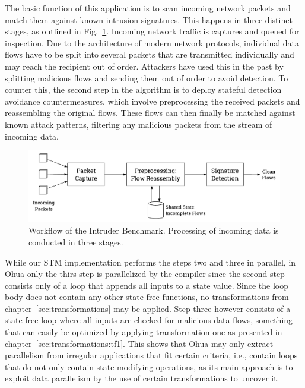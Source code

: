 The basic function of this application is to scan incoming network packets and match them against known intrusion signatures.
This happens in three distinct stages, as outlined in Fig.~\ref{fig:experiments:intruder:workflow}.
Incoming network traffic is captures and queued for inspection.
Due to the architecture of modern network protocols, individual data flows have to be split into several packets that are transmitted individually and may reach the recipient out of order.
Attackers have used this in the past by splitting malicious flows and sending them out of order to avoid detection.
To counter this, the second step in the algorithm is to deploy stateful detection avoidance countermeasures, which involve preprocessing the received packets and reassembling the original flows.
These flows can then finally be matched against known attack patterns, filtering any malicious packets from the stream of incoming data.

\begin{figure}
    \includegraphics[width=\textwidth,keepaspectratio]{gfx/experiments-intruder}
    \caption{Workflow of the Intruder Benchmark. Processing of incoming data is conducted in three stages.}%
    \label{fig:experiments:intruder:workflow}
\end{figure}

While our STM implementation performs the steps two and three in parallel, in Ohua only the thirs step is parallelized by the compiler since the second step consists only of a loop that appends all inputs to a state value.
Since the loop body does not contain any other state-free functions, no transformations from chapter~\ref{sec:transformations} may be applied.
Step three however consists of a state-free loop where all inputs are checked for malicious data flows, something that can easily be optimized by applying transformation one as presented in chapter~\ref{sec:transformations:tf1}.
This shows that Ohua may only extract parallelism from irregular applications that fit certain criteria, i.e., contain loops that do not only contain state-modifying operations, as its main approach is to exploit data parallelism by the use of certain transformations to uncover it.

